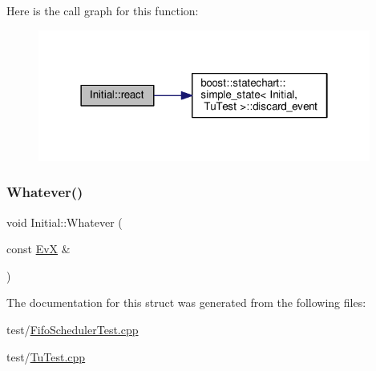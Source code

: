 Here is the call graph for this function\+:
\nopagebreak
\begin{figure}[H]
\begin{center}
\leavevmode
\includegraphics[width=310pt]{struct_initial_ace728b7a36e35687684f77659462e87b_cgraph}
\end{center}
\end{figure}
\mbox{\label{struct_initial_a90852b531c8b25d4f321fc5b37fa86a9}} 
\subsubsection{\texorpdfstring{Whatever()}{Whatever()}}
{\footnotesize\ttfamily void Initial\+::\+Whatever (\begin{DoxyParamCaption}\item[{const \mbox{\hyperlink{struct_ev_x}{EvX}} \&}]{ }\end{DoxyParamCaption})\hspace{0.3cm}{\ttfamily [inline]}}



The documentation for this struct was generated from the following files\+:\begin{DoxyCompactItemize}
\item 
test/\mbox{\hyperlink{_fifo_scheduler_test_8cpp}{Fifo\+Scheduler\+Test.\+cpp}}\item 
test/\mbox{\hyperlink{_tu_test_8cpp}{Tu\+Test.\+cpp}}\end{DoxyCompactItemize}

